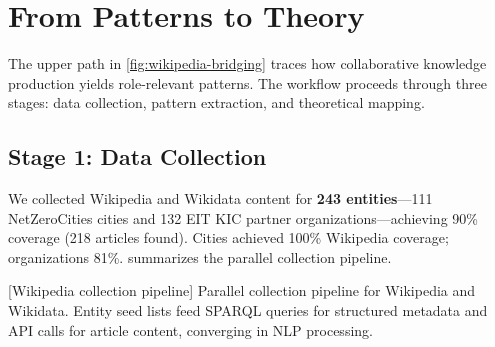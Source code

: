 \documentclass[../main.tex]{subfiles}
\begin{document}
\section{From Patterns to Theory}
\label{sec:wikipedia-patterns-theory}

The upper path in \cref{fig:wikipedia-bridging} traces how collaborative
knowledge production yields role-relevant patterns.
The workflow proceeds through three stages: data collection, pattern extraction,
and theoretical mapping.

\subsection{Stage 1: Data Collection}

We collected Wikipedia and Wikidata content for \textbf{243 entities}---111
NetZeroCities cities and 132 EIT KIC partner organizations---achieving 90\%
coverage (218 articles found).
Cities achieved 100\% Wikipedia coverage; organizations 81\%.
 summarizes the parallel collection pipeline.

\begin{center}
[Wikipedia collection pipeline]{%
    Parallel collection pipeline for Wikipedia and Wikidata.
    Entity seed lists feed SPARQL queries for structured metadata
    and API calls for article content, converging in NLP processing.}
\label{fig:wikipedia-collection}
\end{center}
\end{document}
